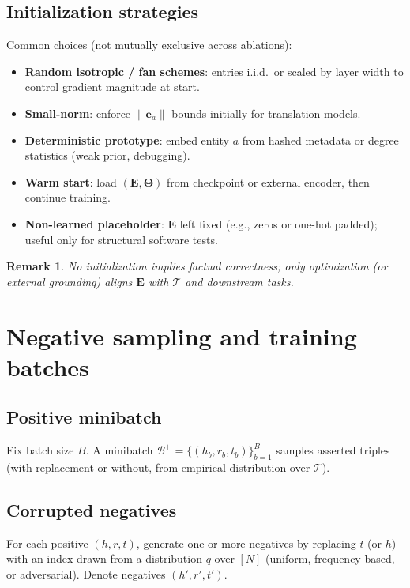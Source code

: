 \documentclass[11pt]{article}
\newtheorem{remark}{Remark}
\begin{document}
\subsection{Initialization strategies}
Common choices (not mutually exclusive across ablations):
\begin{itemize}
  \item \textbf{Random isotropic / fan schemes}: entries i.i.d.\ or scaled by layer width to control gradient magnitude at start.
  \item \textbf{Small-norm}: enforce $\lVert \bm{e}_a \rVert$ bounds initially for translation models.
  \item \textbf{Deterministic prototype}: embed entity $a$ from hashed metadata or degree statistics (weak prior, debugging).
  \item \textbf{Warm start}: load $(\bm{E}, \bm{\Theta})$ from checkpoint or external encoder, then continue training.
  \item \textbf{Non-learned placeholder}: $\bm{E}$ left fixed (e.g., zeros or one-hot padded); useful only for structural software tests.
\end{itemize}

\begin{remark}
No initialization implies factual correctness; only optimization (or external grounding) aligns $\bm{E}$ with $\mathcal{T}$ and downstream tasks.
\end{remark}

\section{Negative sampling and training batches}

\subsection{Positive minibatch}
Fix batch size $B$.
A minibatch $\mathcal{B}^+ = \{ (h_b, r_b, t_b) \}_{b=1}^{B}$ samples asserted triples (with replacement or without, from empirical distribution over $\mathcal{T}$).

\subsection{Corrupted negatives}
For each positive $(h,r,t)$, generate one or more negatives by replacing $t$ (or $h$) with an index drawn from a distribution $q$ over $[N]$ (uniform, frequency-based, or adversarial).
Denote negatives $(h', r', t')$.
\end{document}

